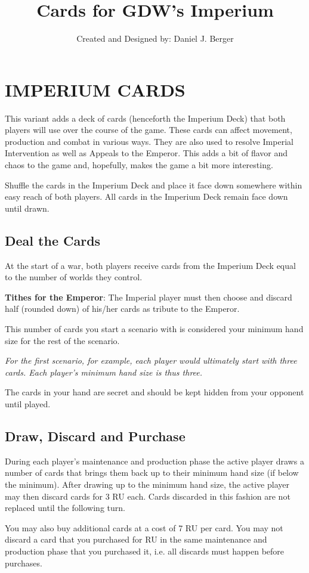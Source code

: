 \documentclass[a4paper,11pt,twocolumn]{article}
\title{Cards for GDW's Imperium}
\author{Created and Designed by: Daniel J. Berger}
\begin{document}
\section{IMPERIUM CARDS}
\hfill

This variant adds a deck of cards (henceforth the Imperium Deck) that both players will use over the course of the game. These cards can affect movement, production and combat in various ways. They are also used to resolve Imperial Intervention as well as Appeals to the Emperor. This adds a bit of flavor and chaos to the game and, hopefully, makes the game a bit more interesting.

Shuffle the cards in the Imperium Deck and place it face down somewhere within easy reach of both players. All cards in the Imperium Deck remain face down until drawn.

\subsection{Deal the Cards}

At the start of a war, both players receive cards from the Imperium Deck equal to the number of worlds they control.

\textbf{Tithes for the Emperor}: The Imperial player must then choose and discard half (rounded down) of his/her cards as tribute to the Emperor.

This number of cards you start a scenario with is considered your minimum hand size for the rest of the scenario.

\textit{For the first scenario, for example, each player would ultimately start with three cards. Each player's minimum hand size is thus three.}

The cards in your hand are secret and should be kept hidden from your opponent until played.

\subsection{Draw, Discard and Purchase}

During each player's maintenance and production phase the active player draws a number of cards that brings them back up to their minimum hand size (if below the minimum). After drawing up to the minimum hand size, the active player may then discard cards for 3 RU each. Cards discarded in this fashion are not replaced until the following turn.

You may also buy additional cards at a cost of 7 RU per card. You may not discard a card that you purchased for RU in the same maintenance and production phase that you purchased it, i.e. all discards must happen before purchases.
\end{document}
